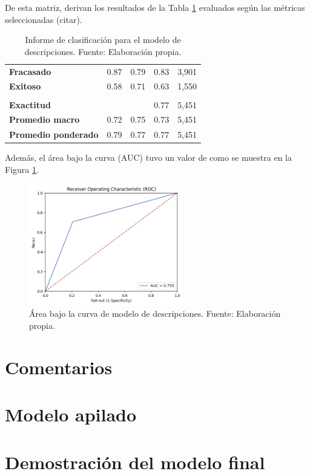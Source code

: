 De esta matriz, derivan los resultados de la Tabla \ref{5:table2} evaluados según las métricas seleccionadas (citar).

\begin{table}[h!]
	\centering
	\small
	\begin{tabular}{ |m{4.5cm}|m{2.5cm}|m{2.5cm}|m{2.5cm}|m{2.5cm}|  }
		\hline
		\rowcolor{bluejean}
		\Centering \color{white}{Valor}& \Centering \color{white}{Precisión}& \Centering \color{white}{Sensibilidad}& \Centering \color{white}{Puntaje F1}& \Centering \color{white}{Muestras}\\
		\hline
		\textbf{Fracasado} & 0.87 & 0.79 & 0.83 & 3,901 \\
		\hline
		\textbf{Exitoso} & 0.58 & 0.71 & 0.63 & 1,550 \\
		\hline
		\rowcolor{turq}
		\multicolumn{5}{c}{ } \\
		\hline
		\textbf{Exactitud} &  &	 & 0.77 & 5,451 \\
		\hline
		\textbf{Promedio macro} & 0.72 & 0.75 & 0.73 & 5,451 \\
		\hline
		\textbf{Promedio ponderado} & 0.79 & 0.77 & 0.77 & 5,451 \\
		\hline
	\end{tabular}
	\caption{Informe de clasificación para el modelo de descripciones. Fuente: Elaboración propia.}
	\label{5:table2}
\end{table}

Además, el área bajo la curva (AUC) tuvo un valor de como se muestra en la Figura \ref{5:fig8}.

\begin{figure}[!ht]
	\begin{center}
		\includegraphics[width=0.60\textwidth]{4/figures/description_auc.png}
		\caption{Área bajo la curva de modelo de descripciones. Fuente: Elaboración propia.}
		\label{5:fig8}
	\end{center}
\end{figure}

\section{Comentarios}

\section{Modelo apilado}

\section{Demostración del modelo final}